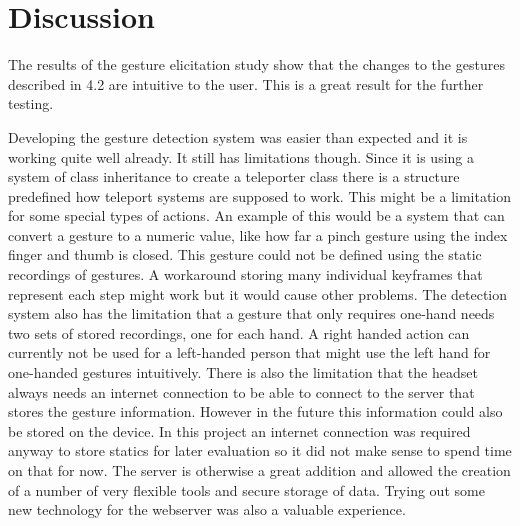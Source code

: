 \chapter{Discussion}

The results of the gesture elicitation study show that the changes to the gestures described in 4.2 are intuitive to the user. %
This is a great result for the further testing.


Developing the gesture detection system was easier than expected and it is working quite well already. It still has limitations though. Since it is using a system of class inheritance to create a teleporter class there is a structure predefined how teleport systems are supposed to work. This might be a limitation for some special types of actions. An example of this would be a system that can convert a gesture to a numeric value, like how far a pinch gesture using the index finger and thumb is closed. This gesture could not be defined using the static recordings of gestures. A workaround storing many individual keyframes that represent each step might work but it would cause other problems. The detection system also has the limitation that a gesture that only requires one-hand needs two sets of stored recordings, one for each hand. A right handed action can currently not be used for a left-handed person that might use the left hand for one-handed gestures intuitively. There is also the limitation that the headset always needs an internet connection to be able to connect to the server that stores the gesture information. However in the future this information could also be stored on the device. In this project an internet connection was required anyway to store statics for later evaluation so it did not make sense to spend time on that for now. The server is otherwise a great addition and allowed the creation of a number of very flexible tools and secure storage of data. Trying out some new technology for the webserver was also a valuable experience. 